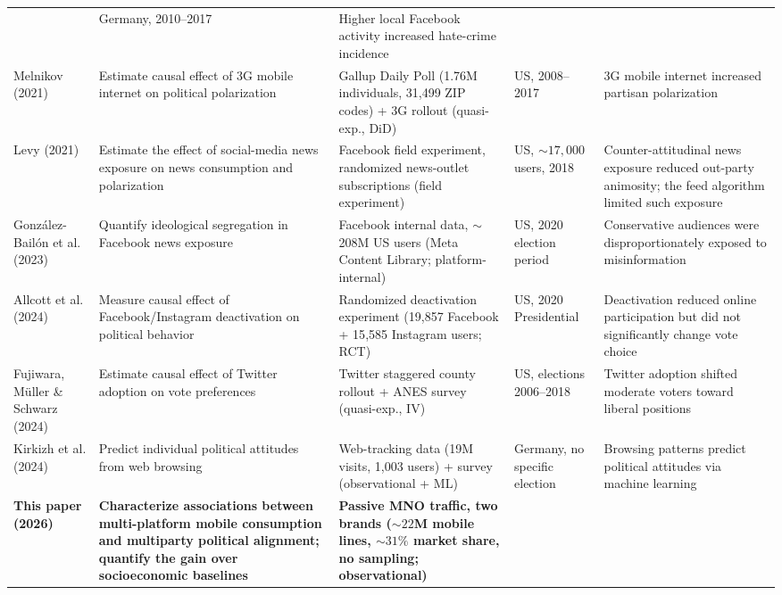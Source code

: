 \documentclass[9pt,sigconf,letterpaper]{acmart}
\begin{document}
\begin{table}[p]
{\begin{minipage}{\textheight}
\begin{tabular}{>{\raggedright\arraybackslash}p{2.7cm} >{\raggedright\arraybackslash}p{3.9cm} >{\raggedright\arraybackslash}p{5.3cm} >{\raggedright\arraybackslash}p{3.6cm} >{\raggedright\arraybackslash}p{5.1cm}}
  & Germany, 2010--2017
  & Higher local Facebook activity increased hate-crime incidence \\
Melnikov (2021)~\cite{melnikov2021mobile}
  & Estimate causal effect of 3G mobile internet on political polarization
  & Gallup Daily Poll (1.76M individuals, 31{,}499 ZIP codes) + 3G rollout (quasi-exp., DiD)
  & US, 2008--2017
  & 3G mobile internet increased partisan polarization \\
Levy (2021)~\cite{levy2021social}
  & Estimate the effect of social-media news exposure on news consumption and polarization
  & Facebook field experiment, randomized news-outlet subscriptions (field experiment)
  & US, ${\sim}17{,}000$ users, 2018
  & Counter-attitudinal news exposure reduced out-party animosity; the feed algorithm limited such exposure \\
Gonz{\'a}lez-Bail{\'o}n et al. (2023)~\cite{gonzalez2023asymmetric}
  & Quantify ideological segregation in Facebook news exposure
  & Facebook internal data, $\sim$208M US users (Meta Content Library; platform-internal)
  & US, 2020 election period
  & Conservative audiences were disproportionately exposed to misinformation \\
Allcott et al. (2024)~\cite{allcott2024effects}
  & Measure causal effect of Facebook/Instagram deactivation on political behavior
  & Randomized deactivation experiment (19{,}857 Facebook + 15{,}585 Instagram users; RCT)
  & US, 2020 Presidential
  & Deactivation reduced online participation but did not significantly change vote choice \\
Fujiwara, M{\"u}ller \& Schwarz (2024)~\cite{fujiwara2024effect}
  & Estimate causal effect of Twitter adoption on vote preferences
  & Twitter staggered county rollout + ANES survey (quasi-exp., IV)
  & US, elections 2006--2018
  & Twitter adoption shifted moderate voters toward liberal positions \\
Kirkizh et al. (2024)~\cite{kirkizh2024predicting}
  & Predict individual political attitudes from web browsing
  & Web-tracking data (19M visits, 1{,}003 users) + survey (observational + ML)
  & Germany, no specific election
  & Browsing patterns predict political attitudes via machine learning \\
\rowcolor{green!20}
\textbf{This paper (2026)}
  & \textbf{Characterize associations between multi-platform mobile consumption and multiparty political alignment; quantify the gain over socioeconomic baselines}
  & \textbf{Passive \ac{MNO} traffic, two brands (${\sim}22$M mobile lines, ${\sim}31\%$ market share, no sampling; observational)}

\end{tabular}
\end{minipage}}
\end{table}
\end{document}
